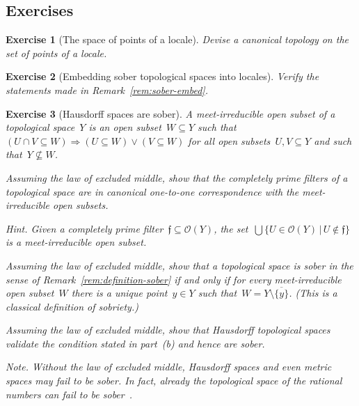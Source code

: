 \documentclass{ws-rv9x6}
\newtheorem{ex}{Exercise}
\newenvironment{exercise}[1]{
  \begin{ex}[#1]
}{\end{ex}}
\renewcommand{\O}{\mathcal{O}}
\newcommand{\fff}{\mathfrak{f}}
\renewcommand{\_}{\mathpunct{.}}
\newcommand{\?}{\,{:}\,}
\begin{document}
\subsection{Exercises}

\begin{exercise}{The space of points of a locale}%
\label{ex:canonical-topology}%
Devise a canonical to\-po\-logy on the set of points of a locale.
\end{exercise}

\begin{exercise}{Embedding sober topological spaces into locales}%
Verify the statements made in Remark~\ref{rem:sober-embed}.
\end{exercise}

\begin{exercise}{Hausdorff spaces are sober}%
\label{ex:hausdorff-sober}%
A \emph{meet-irreducible open subset} of a topological space~$Y$ is an
open subset~$W \subseteq Y$ such that~$(U \cap V \subseteq W) \Rightarrow (U
\subseteq W) \vee (V \subseteq W)$ for all open subsets~$U,V \subseteq Y$ and
such that~$Y \not\subseteq W$.
\begin{alphlist}[(c)]
\item Assuming the law of excluded middle, show that the completely prime
filters of a topological space are in canonical one-to-one correspondence with
the meet-irreducible open subsets.\smallskip

{\scriptsize\emph{Hint.} Given a completely prime filter~$\fff \subseteq
\O(Y)$, the set~$\bigcup\{ U \in \O(Y) \,|\, U \not\in \fff \}$ is a
meet-irreducible open subset.\par}
\item Assuming the law of excluded middle, show that a topological space is
sober in the sense of Remark~\ref{rem:definition-sober} if and only if for
every meet-irreducible open subset~$W$ there is a unique point~$y \in Y$ such
that~$W = Y \setminus \overline{\{y\}}$.
(This is a classical definition of sobriety.)

\item Assuming the law of excluded middle, show that Hausdorff topological
spaces validate the condition stated in part~(b) and hence are sober.
\end{alphlist}
{\scriptsize\emph{Note.} Without the law of excluded middle, Hausdorff spaces
and even metric spaces may fail to be sober. In fact, already the topological
space of the rational numbers can fail to be
sober~\cite[Example~8.14(iv)]{fourman-scott:sheaves-and-logic}.\par}
\end{exercise}
\end{document}
